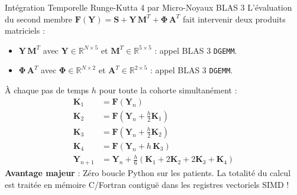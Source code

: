 \documentclass[aspectratio=169, 10pt, french]{beamer}
\begin{document}
\begin{frame}{Intégration Temporelle Runge-Kutta 4 par Micro-Noyaux BLAS 3}
    L'évaluation du second membre $\mathbf{F}(\mathbf{Y}) = \mathbf{S} + \mathbf{Y}\,\mathbf{M}^T + \mathbf{\Phi}\,\mathbf{A}^T$ fait intervenir deux produits matriciels :
    \begin{itemize}
        \item $\mathbf{Y}\,\mathbf{M}^T$ avec $\mathbf{Y} \in \mathbb{R}^{N \times 5}$ et $\mathbf{M}^T \in \mathbb{R}^{5 \times 5}$ : appel BLAS 3 \texttt{DGEMM}.
        \item $\mathbf{\Phi}\,\mathbf{A}^T$ avec $\mathbf{\Phi} \in \mathbb{R}^{N \times 2}$ et $\mathbf{A}^T \in \mathbb{R}^{2 \times 5}$ : appel BLAS 3 \texttt{DGEMM}.
    \end{itemize}

    \begin{cadrehpc}
        \small
        À chaque pas de temps $h$ pour toute la cohorte simultanément :
        \begin{align*}
            \mathbf{K}_1 &= \mathbf{F}(\mathbf{Y}_n) \\
            \mathbf{K}_2 &= \mathbf{F}\left(\mathbf{Y}_n + \frac{h}{2}\mathbf{K}_1\right) \\
            \mathbf{K}_3 &= \mathbf{F}\left(\mathbf{Y}_n + \frac{h}{2}\mathbf{K}_2\right) \\
            \mathbf{K}_4 &= \mathbf{F}(\mathbf{Y}_n + h\,\mathbf{K}_3) \\
            \mathbf{Y}_{n+1} &= \mathbf{Y}_n + \frac{h}{6}\left(\mathbf{K}_1 + 2\mathbf{K}_2 + 2\mathbf{K}_3 + \mathbf{K}_4\right)
        \end{align*}
        \textbf{Avantage majeur} : Zéro boucle Python sur les patients. La totalité du calcul est traitée en mémoire C/Fortran contiguë dans les registres vectoriels SIMD !
    \end{cadrehpc}
\end{frame}

\end{document}
